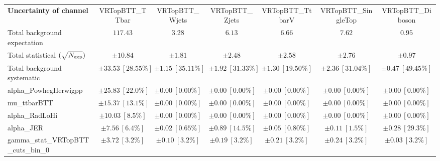 
\begin{sidewaystable}
\begin{center}
\setlength{\tabcolsep}{0.0pc}
\begin{tabular*}{\textwidth}{@{\extracolsep{\fill}}lcccccc}
\noalign{\smallskip}\hline\noalign{\smallskip}
{\bf Uncertainty of channel}                                    & VRTopBTT\_TTbar            & VRTopBTT\_Wjets            & VRTopBTT\_Zjets            & VRTopBTT\_TtbarV            & VRTopBTT\_SingleTop            & VRTopBTT\_Diboson            \\
\noalign{\smallskip}\hline\noalign{\smallskip}
Total background expectation             &  $117.43$        &  $3.28$        &  $6.13$        &  $6.66$        &  $7.62$        &  $0.95$       \\
\noalign{\smallskip}\hline\noalign{\smallskip}
Total statistical $(\sqrt{N_{\rm exp}})$              & $\pm 10.84$        & $\pm 1.81$        & $\pm 2.48$        & $\pm 2.58$        & $\pm 2.76$        & $\pm 0.97$       \\
Total background systematic               & $\pm 33.53\ [28.55\%] $        & $\pm 1.15\ [35.11\%] $        & $\pm 1.92\ [31.33\%] $        & $\pm 1.30\ [19.50\%] $        & $\pm 2.36\ [31.04\%] $        & $\pm 0.47\ [49.45\%] $             \\
\noalign{\smallskip}\hline\noalign{\smallskip}
\noalign{\smallskip}\hline\noalign{\smallskip}
alpha\_PowhegHerwigpp         & $\pm 25.83\ [22.0\%] $          & $\pm 0.00\ [0.00\%] $          & $\pm 0.00\ [0.00\%] $          & $\pm 0.00\ [0.00\%] $          & $\pm 0.00\ [0.00\%] $          & $\pm 0.00\ [0.00\%] $       \\
mu\_ttbarBTT         & $\pm 15.37\ [13.1\%] $          & $\pm 0.00\ [0.00\%] $          & $\pm 0.00\ [0.00\%] $          & $\pm 0.00\ [0.00\%] $          & $\pm 0.00\ [0.00\%] $          & $\pm 0.00\ [0.00\%] $       \\
alpha\_RadLoHi         & $\pm 10.03\ [8.5\%] $          & $\pm 0.00\ [0.00\%] $          & $\pm 0.00\ [0.00\%] $          & $\pm 0.00\ [0.00\%] $          & $\pm 0.00\ [0.00\%] $          & $\pm 0.00\ [0.00\%] $       \\
alpha\_JER         & $\pm 7.56\ [6.4\%] $          & $\pm 0.02\ [0.65\%] $          & $\pm 0.89\ [14.5\%] $          & $\pm 0.05\ [0.80\%] $          & $\pm 0.11\ [1.5\%] $          & $\pm 0.28\ [29.3\%] $       \\
gamma\_stat\_VRTopBTT\_cuts\_bin\_0         & $\pm 3.72\ [3.2\%] $          & $\pm 0.10\ [3.2\%] $          & $\pm 0.19\ [3.2\%] $          & $\pm 0.21\ [3.2\%] $          & $\pm 0.24\ [3.2\%] $          & $\pm 0.03\ [3.2\%] $       \\

\end{tabular*}
\end{center}
\end{sidewaystable}

